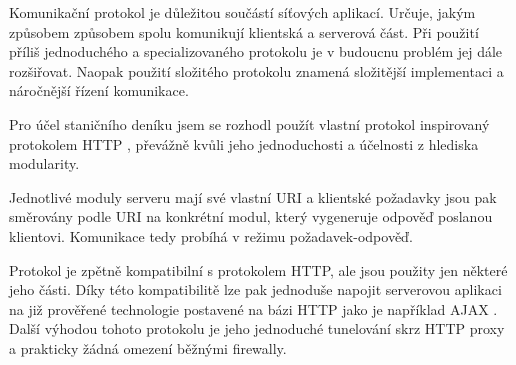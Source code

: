 
Komunikační protokol je důležitou součástí síťových aplikací. Určuje, jakým způsobem způsobem spolu komunikují
klientská a serverová část. Při použití příliš jednoduchého a specializovaného protokolu je v budoucnu problém
jej dále rozšiřovat. Naopak použití složitého protokolu znamená složitější implementaci a náročnější řízení komunikace.

Pro účel staničního deníku jsem se rozhodl použít vlastní protokol inspirovaný protokolem HTTP \cite{http},
převážně kvůli jeho jednoduchosti a účelnosti z hlediska modularity.

Jednotlivé moduly serveru mají své vlastní URI a klientské požadavky jsou pak směrovány podle URI na konkrétní modul,
který vygeneruje odpověď poslanou klientovi. Komunikace tedy probíhá v režimu požadavek-odpověď.

Protokol je zpětně kompatibilní s protokolem HTTP, ale jsou použity jen některé jeho části. Díky této kompatibilitě
lze pak jednoduše napojit serverovou aplikaci na již prověřené technologie postavené na bázi HTTP jako je například
AJAX \cite{ajax}. Další výhodou tohoto protokolu je jeho jednoduché tunelování skrz HTTP proxy a prakticky žádná
omezení běžnými firewally.


